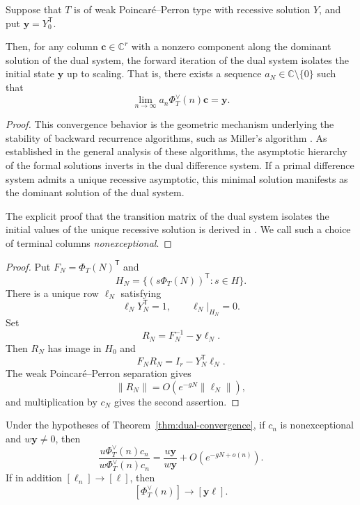 \documentclass[oneside,english,11pt]{amsart}
\begin{document}
\begin{thm}
\label{thm:dual-convergence}
Suppose that $T$ is of weak Poincar\'e--Perron type
with recessive solution $Y$, and put
$\mathbf y=Y_0^{\mathsf T}$.

Then, for any column $\mathbf c\in\mathbb C^r$ with
a nonzero component along the dominant solution
of the dual system, the forward iteration of the dual
system isolates the initial state $\mathbf y$ up to scaling.
That is, there exists a sequence
$a_N\in\mathbb C\setminus\{0\}$ such that
\[
    \lim_{n\to\infty}
    a_n\Phi_T^\vee(n)\mathbf c
    =
    \mathbf y.
\]
\end{thm}
\begin{proof}
This convergence behavior is the geometric mechanism underlying the stability of backward recurrence algorithms, such as Miller's algorithm \cite{gautschi1967computational}.
As established in the general analysis of these algorithms, the asymptotic hierarchy of the formal solutions inverts in the dual difference system. If a primal difference system admits a unique recessive asymptotic, this minimal solution manifests as the dominant solution of the dual system.

The explicit proof that the transition matrix of the dual system isolates the initial values of the unique recessive solution is derived in \cite[Section 2]{zahar1976mathematical}.
We call such a choice of terminal columns \emph{nonexceptional}.
\end{proof}

\begin{proof}
Put $F_N=\Phi_T(N)^{\mathsf T}$ and
\[
    H_N=\{(s\Phi_T(N))^{\mathsf T}:s\in H\}.
\]
There is a unique row $\ell_N$ satisfying
\[
    \ell_NY_N^{\mathsf T}=1,
    \qquad
    \ell_N|_{H_N}=0.
\]
Set
\[
    R_N=F_N^{-1}-\mathbf y\ell_N.
\]
Then $R_N$ has image in $H_0$ and
\[
    F_NR_N=I_r-Y_N^{\mathsf T}\ell_N.
\]
The weak Poincar\'e--Perron separation gives
\[
    \|R_N\|
    =O\!\left(e^{-gN}\|\ell_N\|\right),
\]
and multiplication by $c_N$ gives the second assertion.
\end{proof}

\begin{cor}
\label{cor:dual-rank-one}
Under the hypotheses of Theorem~\ref{thm:dual-convergence}, if $c_n$
is nonexceptional and $w\mathbf y\ne0$, then
\[
    \frac{u\Phi_T^\vee(n)c_n}
         {w\Phi_T^\vee(n)c_n}
    =
    \frac{u\mathbf y}{w\mathbf y}
    +O(e^{-gN+o(n)}).
\]
If in addition $[\ell_n]\to[\ell]$, then
\[
    [\Phi_T^\vee(n)]\longrightarrow[\mathbf y\ell].
\]
\end{cor}
\end{document}
